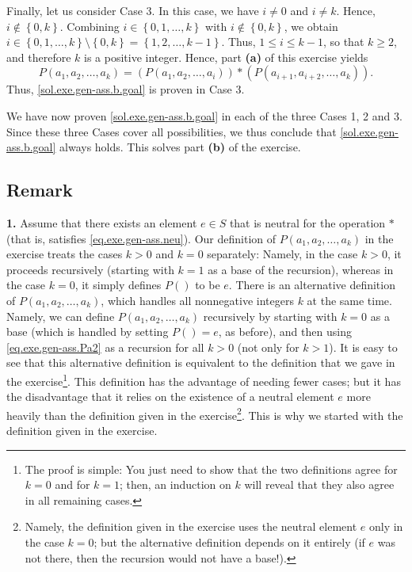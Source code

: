 \documentclass[paper=a4, fontsize=12pt]{scrartcl} %
\newcommand{\set}[1]{\left\{ #1 \right\}}
\newcommand{\tup}[1]{\left( #1 \right)}
\theoremstyle{plainsl}
\theoremstyle{definition}
\theoremstyle{remark}
\begin{document}
Finally, let us consider Case 3.
In this case, we have $i \neq 0$ and $i \neq k$.
Hence, $i \notin \set{0, k}$.
Combining $i \in \set{0, 1, \ldots, k}$ with
$i \notin \set{0, k}$, we obtain
$i \in \set{0, 1, \ldots, k} \setminus \set{0, k}
= \set{1, 2, \ldots, k-1}$.
Thus, $1 \leq i \leq k-1$, so that $k \geq 2$,
and therefore $k$ is a positive integer.
Hence, part \textbf{(a)} of this exercise yields
\[
P \tup{a_1, a_2, \ldots, a_k}
= \tup{P \tup{a_1, a_2, \ldots, a_i}}
     * \tup{P \tup{a_{i+1}, a_{i+2}, \ldots, a_k}} .
\]
Thus, \eqref{sol.exe.gen-ass.b.goal} is proven in Case 3.

We have now proven \eqref{sol.exe.gen-ass.b.goal} in each
of the three Cases 1, 2 and 3.
Since these three Cases cover all possibilities, we thus
conclude that \eqref{sol.exe.gen-ass.b.goal} always holds.
This solves part \textbf{(b)} of the exercise.

\subsection{Remark}

\textbf{1.}
Assume that there exists an element $e \in S$
that is neutral for the operation $*$ (that is,
satisfies \eqref{eq.exe.gen-ass.neu}).
Our definition of $P \tup{a_1, a_2, \ldots, a_k}$
in the exercise treats the cases $k > 0$ and
$k = 0$ separately: Namely, in the case $k > 0$,
it proceeds recursively (starting with $k = 1$ as
a base of the recursion), whereas in the case
$k = 0$, it simply defines $P \tup{}$ to be $e$.
There is an alternative definition of
$P \tup{a_1, a_2, \ldots, a_k}$, which handles
all nonnegative integers $k$ at the same time.
Namely, we can define
$P \tup{a_1, a_2, \ldots, a_k}$ recursively
by starting with $k = 0$ as a base (which is
handled by setting $P \tup{} = e$, as before),
and then using \eqref{eq.exe.gen-ass.Pa2} as a
recursion for all $k > 0$ (not only for $k > 1$).
It is easy to see that this alternative definition
is equivalent to the definition that we gave in
the exercise\footnote{The proof is simple:
You just need to show that the two definitions
agree for $k = 0$ and for $k = 1$; then, an induction
on $k$ will reveal that they also agree in all
remaining cases.}.
This definition has the advantage of needing fewer
cases; but it has the disadvantage that it relies
on the existence of a neutral element $e$ more
heavily than the definition given in the
exercise\footnote{Namely, the definition given in
the exercise uses the neutral element $e$ only in
the case $k = 0$; but the alternative definition
depends on it entirely (if $e$ was not there, then
the recursion would not have a base!).}.
This is why we started with the definition given
in the exercise.
\end{document}
